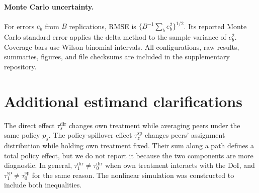 \documentclass[10pt]{article}
\theoremstyle{definition}
\theoremstyle{remark}
\begin{document}
\paragraph{Monte Carlo uncertainty.}
For errors $e_b$ from $B$ replications, RMSE is
$\{B^{-1}\sum_b e_b^2\}^{1/2}$. Its reported Monte Carlo standard error applies the delta
method to the sample variance of $e_b^2$. Coverage bars use Wilson binomial intervals.
All configurations, raw results, summaries, figures, and file checksums are included in the
supplementary repository.

\section{Additional estimand clarifications}

The direct effect $\tau_s^{\mathrm{dir}}$ changes own treatment while averaging peers under the
same policy $p_s$. The policy-spillover effect $\tau_z^{\mathrm{sp}}$ changes peers' assignment
distribution while holding own treatment fixed. Their sum along a path defines a total policy
effect, but we do not report it because the two components are more diagnostic. In general,
$\tau_1^{\mathrm{dir}}\ne\tau_0^{\mathrm{dir}}$ when own treatment interacts with the DoI, and
$\tau_1^{\mathrm{sp}}\ne\tau_0^{\mathrm{sp}}$ for the same reason. The nonlinear simulation was
constructed to include both inequalities.
\end{document}
